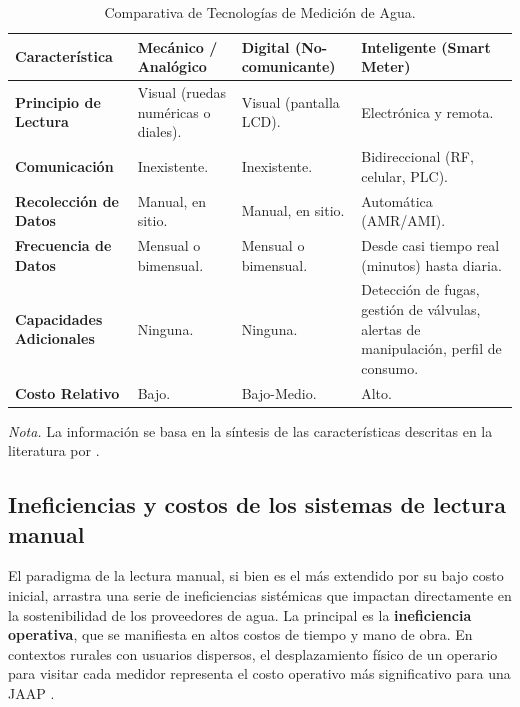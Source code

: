 \begin{table}[H]
    \centering
    \caption{Comparativa de Tecnologías de Medición de Agua.}
    \label{tab:meter_comparison}
    \begin{singlespace} 
    \begin{tabularx}{\textwidth}{>{\bfseries}l >{\raggedright\arraybackslash}X >{\raggedright\arraybackslash}X >{\raggedright\arraybackslash}X}
        \toprule
        \textbf{Característica} & \textbf{Mecánico / Analógico} & \textbf{Digital (No-comunicante)} & \textbf{Inteligente (Smart Meter)} \\
        \midrule
        Principio de Lectura & Visual (ruedas numéricas o diales). & Visual (pantalla LCD). & Electrónica y remota. \\
        \addlinespace
        Comunicación & Inexistente. & Inexistente. & Bidireccional (RF, celular, PLC). \\
        \addlinespace
        Recolección de Datos & Manual, en sitio. & Manual, en sitio. & Automática (AMR/AMI). \\
        \addlinespace
        Frecuencia de Datos & Mensual o bimensual. & Mensual o bimensual. & Desde casi tiempo real (minutos) hasta diaria. \\
        \addlinespace
        Capacidades Adicionales & Ninguna. & Ninguna. & Detección de fugas, gestión de válvulas, alertas de manipulación, perfil de consumo. \\
        \addlinespace
        Costo Relativo & Bajo. & Bajo-Medio. & Alto. \\
        \bottomrule
    \end{tabularx}
    \end{singlespace}
    \parbox{\textwidth}{
        \singlespace
        \textit{Nota.} La información se basa en la síntesis de las características descritas en la literatura por \parencite{Salomon2022ImageBased, Santiago2020Deployment, Peng2023Deep, IADB2022, Laroca2021Towards}.
    }
\end{table}

\subsection{Ineficiencias y costos de los sistemas de lectura manual}
\label{ssec:manual_reading_inefficiencies}

El paradigma de la lectura manual, si bien es el más extendido por su bajo costo inicial, arrastra una serie de ineficiencias sistémicas que impactan directamente en la sostenibilidad de los proveedores de agua. La principal es la \textbf{ineficiencia operativa}, que se manifiesta en altos costos de tiempo y mano de obra. En contextos rurales con usuarios dispersos, el desplazamiento físico de un operario para visitar cada medidor representa el costo operativo más significativo para una JAAP \parencite{Santiago2020Deployment}.

